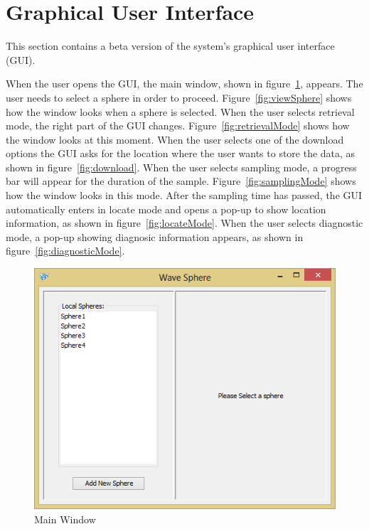 \section{Graphical User Interface}

This section contains a beta version of the system's graphical user interface (GUI).

When the user opens the GUI, the main window, shown in figure~\ref{fig:mainWindow}, appears. The user needs to select a sphere in order to proceed.  Figure~\ref{fig:viewSphere} shows how the window looks when a sphere is selected. When the user selects retrieval mode, the right part of the GUI changes. Figure~\ref{fig:retrievalMode} shows how the window looks at this moment.  When the user selects one of the download options the GUI asks for the location where the user wants to store the data, as shown in figure~\ref{fig:download}. When the user selects sampling mode, a progress bar will appear for the duration of the sample. Figure~\ref{fig:samplingMode} shows how the window looks in this mode. After the sampling time has passed, the GUI automatically enters in locate mode and opens a pop-up to show location information, as shown in figure~\ref{fig:locateMode}. When the user selects diagnostic mode, a pop-up showing diagnosic information appears, as shown in figure~\ref{fig:diagnosticMode}.

\begin{figure}[H]
	\centering
	\includegraphics[scale=0.7]{img/mainWindow}
	\caption{Main Window \label{fig:mainWindow}}
\end{figure}

